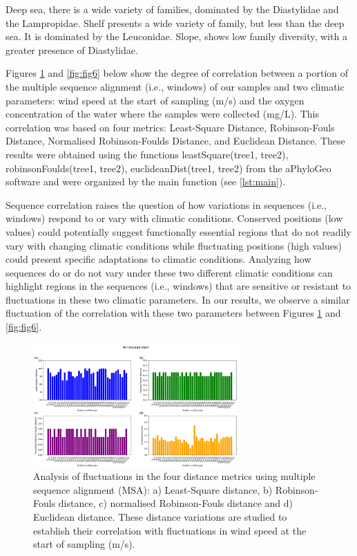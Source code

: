 Deep sea, there is a wide variety of families, dominated by the Diastylidae and the Lampropidae. Shelf presents a wide variety of family, but less than the deep sea. It is dominated by the Leuconidae. Slope, shows low family diversity, with a greater presence of Diastylidae. 

Figures \ref{fig:fig5} and \ref{fig:fig6} below show the degree of correlation between a portion of the multiple sequence alignment (i.e., windows) of our samples and two climatic parameters: wind speed at the start of sampling (m/s) and the oxygen concentration of the water where the samples were collected (mg/L). This correlation was based on four metrics: Least-Square Distance, Robinson-Fouls Distance, Normalised Robinson-Foulds Distance, and Euclidean Distance. These results were obtained using the functions leastSquare(tree1, tree2), robinsonFoulds(tree1, tree2), euclideanDist(tree1, tree2) from the aPhyloGeo software and were organized by the main function (see \autoref{lst:main}). 

Sequence correlation raises the question of how variations in sequences (i.e., windows) respond to or vary with climatic conditions. Conserved positions (low values) could potentially suggest functionally essential regions that do not readily vary with changing climatic conditions while fluctuating positions (high values) could present specific adaptations to climatic conditions. Analyzing how sequences do or do not vary under these two different climatic conditions can highlight regions in the sequences (i.e., windows) that are sensitive or resistant to fluctuations in these two climatic parameters. In our results, we observe a similar fluctuation of the correlation with these two parameters between Figures \ref{fig:fig5} and \ref{fig:fig6}.

\begin{figure}[]
    \centering
    \includegraphics[width=0.7\textwidth]{figure5.png}
    \caption{Analysis of fluctuations in the four distance metrics using multiple sequence alignment (MSA): a) Least-Square distance, b) Robinson-Fouls distance, c) normalised Robinson-Fouls distance and d) Euclidean distance. These distance variations are studied to establish their correlation with fluctuations in wind speed at the start of sampling (m/s). \label{fig:fig5}}
\end{figure}

